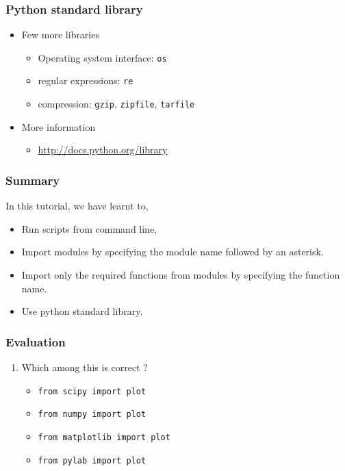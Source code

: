 \documentclass[17pt]{beamer}
\newcounter{saveenumi}
\newcommand{\seti}{\setcounter{saveenumi}{\value{enumi}}}
\begin{document}
\begin{frame}
\frametitle{Python standard library}
\label{sec-14.2}

\begin{itemize}
\item Few more libraries
	\begin{itemize}
	\item Operating system interface: \texttt{os}\pause
	\item regular expressions: \texttt{re}\pause
	\item compression: \texttt{gzip}, \texttt{zipfile}, \texttt{tarfile}
	\end{itemize}\pause
\item More information
	\begin{itemize}
	\item \href{http://docs.python.org/library}{http://docs.python.org/library}
	\end{itemize}
\end{itemize}
\end{frame}
\begin{frame}
\frametitle{Summary}
\label{sec-15}

  In this tutorial, we have learnt to,

\begin{itemize}
\item Run scripts from command line,\pause
\item Import modules by specifying the module name followed by  
    an asterisk.\pause
\item Import only the required functions from modules by specifying 
    the function name.\pause
\item Use python standard library.
\end{itemize}
\end{frame}
\begin{frame}
\frametitle{Evaluation}
\label{sec-16.1}

\begin{enumerate}
\item Which among this is correct ?\pause
	\begin{itemize}
	\item \texttt{from scipy import plot}
	\item \texttt{from numpy import plot}
	\item \texttt{from matplotlib import plot}
	\item \texttt{from pylab import plot}
	\end{itemize}
	\seti
\end{enumerate}
\end{frame}
\end{document}
